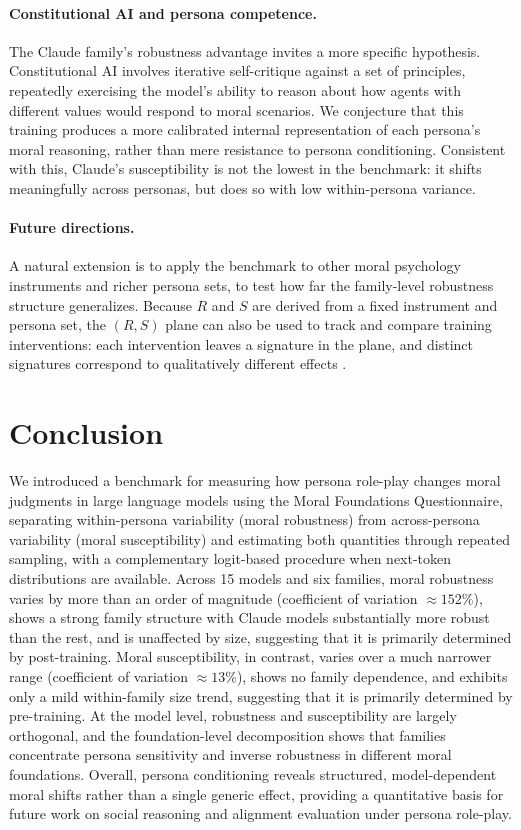 \documentclass{article}
\begin{document}
\paragraph{Constitutional AI and persona competence.}
The Claude family's robustness advantage invites a more specific hypothesis. Constitutional AI \citep{bai2022constitutional} involves iterative self-critique against a set of principles, repeatedly exercising the model's ability to reason about how agents with different values would respond to moral scenarios. We conjecture that this training produces a more calibrated internal representation of each persona's moral reasoning, rather than mere resistance to persona conditioning. Consistent with this, Claude's susceptibility is not the lowest in the benchmark: it shifts meaningfully across personas, but does so with low within-persona variance.

\paragraph{Future directions.}
A natural extension is to apply the benchmark to other moral psychology instruments and richer persona sets, to test how far the family-level robustness structure generalizes. Because $R$ and $S$ are derived from a fixed instrument and persona set, the $(R, S)$ plane can also be used to track and compare training interventions: each intervention leaves a signature in the plane, and distinct signatures correspond to qualitatively different effects \citep{costa2026personacollapse}.

\section{Conclusion}
We introduced a benchmark for measuring how persona role-play changes moral judgments in large language models using the Moral Foundations Questionnaire, separating within-persona variability (moral robustness) from across-persona variability (moral susceptibility) and estimating both quantities through repeated sampling, with a complementary logit-based procedure when next-token distributions are available. Across 15 models and six families, moral robustness varies by more than an order of magnitude (coefficient of variation $\approx 152\%$), shows a strong family structure with Claude models substantially more robust than the rest, and is unaffected by size, suggesting that it is primarily determined by post-training. Moral susceptibility, in contrast, varies over a much narrower range (coefficient of variation $\approx 13\%$), shows no family dependence, and exhibits only a mild within-family size trend, suggesting that it is primarily determined by pre-training. At the model level, robustness and susceptibility are largely orthogonal, and the foundation-level decomposition shows that families concentrate persona sensitivity and inverse robustness in different moral foundations. Overall, persona conditioning reveals structured, model-dependent moral shifts rather than a single generic effect, providing a quantitative basis for future work on social reasoning and alignment evaluation under persona role-play.
\end{document}
